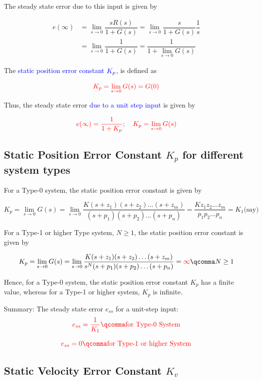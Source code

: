 \documentclass[
  14pt,
  a4paper,
  oneside,
  open=any,
  a4paper,
  14pt]{report}
\begin{document}
The steady state error due to this input is given by

\[
\begin{aligned}
    e(\infty) &= \lim_{s \to 0} \dfrac{sR(s)}{1+G(s)} = \lim_{s \to 0} \dfrac{s}{1+G(s)} \dfrac{1}{s} \\
    &= \lim_{s \to 0} \dfrac{1}{1+G(s)} = \dfrac{1}{1+ \lim\limits_{s \to 0} G(s)}
\end{aligned}
\]

The \textcolor{blue}{static position error constant}
\(\textcolor{blue}{K_p}\), is defined as

\[
    \textcolor{red}{K_p = \lim_{s \to 0} G(s) = G(0)}
\]

Thus, the steady state error \textcolor{blue}{due to a unit step input}
is given by

\[
    \textcolor{red}{e(\infty) = \dfrac{1}{1+K_p}; \quad K_p = \lim_{s \to 0} G(s)}
\]

\subsection{\texorpdfstring{Static Position Error Constant \(K_p\) for
different system
types}{Static Position Error Constant K\_p for different system types}}\label{static-position-error-constant-k_p-for-different-system-types}

For a Type-0 system, the static position error constant is given by

\[
    K_p = \lim_{s \to 0} G(s) = \lim_{s \to 0} \dfrac{K(s+z_1)(s+z_2) \ldots (s+z_m)}{(s+p_1)(s+p_2) \ldots (s+p_n)} = \dfrac{K z_1 z_2 \ldots z_m}{p_1 p_2 \ldots p_n} = K_1 \text{(say)} 
\]

For a Type-1 or higher Type system, \(N \geq 1\), the static position
error constant is given by

\[
    K_p = \lim_{s \to 0} G(s) = \lim_{s \to 0} \dfrac{K(s+z_1)(s+z_2) \ldots (s+z_m)}{s^N(s+p_1)(s+p_2) \ldots (s+p_n)} = \textcolor{red}{\infty}\qcomma N \geq 1
\]

Hence, for a Type-0 system, the static position error constant \(K_p\)
has a finite value, whereas for a Type-1 or higher system, \(K_p\) is
infinite.

Summary: The steady state error \(e_{ss}\) for a unit-step input: \[
    \textcolor{red}{e_{ss} = \dfrac{1}{K_1} \qcomma \text{for Type-0 System}}
\]

\[
    \textcolor{red}{e_{ss} = 0 \qcomma \text{for Type-1 or higher System}}
\]

\subsection{\texorpdfstring{Static Velocity Error Constant
\(K_v\)}{Static Velocity Error Constant K\_v}}\label{static-velocity-error-constant-k_v}
\end{document}
